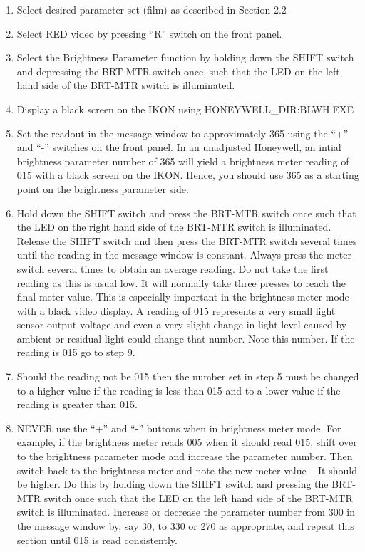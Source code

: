 \begin{enumerate}

\item Select desired parameter set (film) as described in Section 2.2

\item Select RED video by pressing ``R'' switch on the front panel.

\item Select the Brightness Parameter function by holding down the SHIFT
switch and depressing the BRT-MTR switch once, such that the LED on
the left hand side of the BRT-MTR switch is illuminated.

\item Display a black screen on the IKON using HONEYWELL\_DIR:BLWH.EXE

\item Set the readout in the message window to approximately 365 using the
``+'' and ``-''  switches on the front panel.
In an unadjusted Honeywell,
an intial brightness parameter number of 365 will yield a brightness meter
reading of 015 with a black screen on the IKON. Hence, you should use 365
as a starting point on the brightness parameter side.

\item Hold down the SHIFT switch and press the BRT-MTR switch once such
that the LED on the right hand side of the BRT-MTR switch is
illuminated.  Release the SHIFT switch and then press the BRT-MTR switch
several times until the reading in the message window is constant.
Always press the meter switch several times to obtain an average reading.
Do not take the first reading as this is usual low. It will normally
take three presses to reach the final meter value. This is especially important
in the brightness meter mode with a black video display. A reading of
015 represents a very small light sensor output voltage and even a very
slight change in light level caused by ambient or residual light could change
that number.
Note this number.  If the reading is 015 go to step 9.

\item Should the reading not be 015 then the number set in step 5 must
be changed to a higher value if the reading is less than 015 and to a
lower value if the reading is greater than 015.

\item
NEVER use the ``+'' and ``-'' buttons when in brightness meter mode.
For example, if the brightness meter reads 005 when it should read 015, shift
over to the brightness parameter mode and increase the parameter number. Then switch
back to the brightness meter and note the new meter value -- It should be higher.
Do this by holding down the SHIFT switch and pressing the BRT-MTR switch
once such that the LED on the left hand side of the BRT-MTR switch is
illuminated.
Increase or decrease the parameter number from 300 in the message
window by, say 30, to 330 or 270 as appropriate, and repeat this
section until 015 is read consistently.


\end{enumerate}
